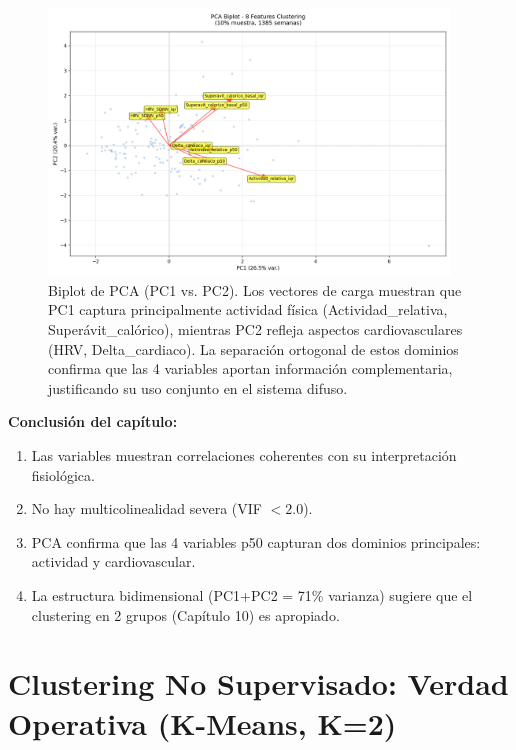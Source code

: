 \documentclass[12pt,letterpaper,twoside]{report}
\begin{document}
\begin{figure}[htbp]
\centering
\includegraphics[width=0.95\textwidth]{../analisis_u/semanal/precluster/pca_biplot.png}
\caption{Biplot de PCA (PC1 vs. PC2). Los vectores de carga muestran que PC1 captura principalmente actividad física (Actividad\_relativa, Superávit\_calórico), mientras PC2 refleja aspectos cardiovasculares (HRV, Delta\_cardiaco). La separación ortogonal de estos dominios confirma que las 4 variables aportan información complementaria, justificando su uso conjunto en el sistema difuso.}
\label{fig:pca_biplot}
\end{figure}

\begin{conclusionbox}
\textbf{Conclusión del capítulo:}

\begin{enumerate}[noitemsep]
    \item Las variables muestran correlaciones coherentes con su interpretación fisiológica.
    \item No hay multicolinealidad severa (VIF $< 2.0$).
    \item PCA confirma que las 4 variables p50 capturan dos dominios principales: actividad y cardiovascular.
    \item La estructura bidimensional (PC1+PC2 = 71\% varianza) sugiere que el clustering en 2 grupos (Capítulo 10) es apropiado.
\end{enumerate}
\end{conclusionbox}

\chapter{Clustering No Supervisado: Verdad Operativa (K-Means, K=2)}
\end{document}
